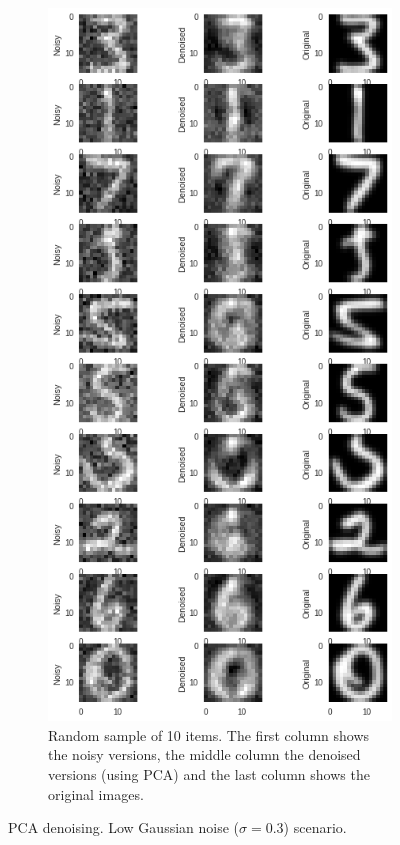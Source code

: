\documentclass[a4paper,11pt]{article}
\begin{document}
\begin{figure}
\begin{subfigure}[t]{0.45\textwidth}
		\includegraphics[width=\textwidth]{images/assignment5-3-lgn2.png}
		\caption{Random sample of 10 items. The first column shows the noisy versions, the middle column the denoised versions (using PCA) and the last column shows the original images.}
		\label{fig:assignment5-3-lgn2}
	\end{subfigure}
	\caption{PCA denoising. Low Gaussian noise ($\sigma=0.3$) scenario.}
	\label{fig:assignment5-3-lgn}
\end{figure}
\end{document}
